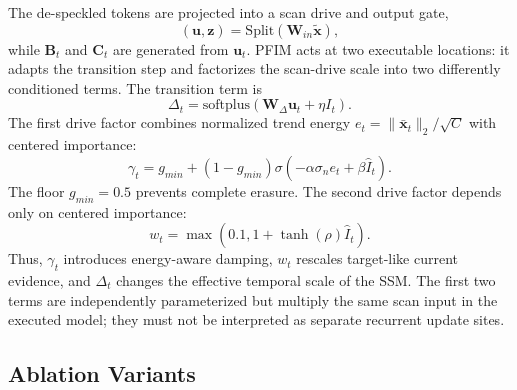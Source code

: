 \documentclass[letterpaper]{article}
\begin{document}
The de-speckled tokens are projected into a scan drive and output gate,
\begin{equation}
  (\mathbf{u},\mathbf{z})=\mathrm{Split}(\mathbf{W}_{in}\widetilde{\mathbf{x}}),
\end{equation}
while $\mathbf{B}_t$ and $\mathbf{C}_t$ are generated from $\mathbf{u}_t$. PFIM acts at two executable locations: it adapts the transition step and factorizes the scan-drive scale into two differently conditioned terms. The transition term is
\begin{equation}
  \Delta_t=\mathrm{softplus}(\mathbf{W}_{\Delta}\mathbf{u}_t+\eta I_t).
  \label{eq:delta}
\end{equation}
The first drive factor combines normalized trend energy $e_t=\lVert\bar{\mathbf{x}}_t\rVert_2/\sqrt{C}$ with centered importance:
\begin{equation}
  \gamma_t=g_{min}+(1-g_{min})
  \sigma(-\alpha\sigma_n e_t+\beta\widehat I_t).
  \label{eq:gamma}
\end{equation}
The floor $g_{min}=0.5$ prevents complete erasure. The second drive factor depends only on centered importance:
\begin{equation}
  w_t=\max\!\left(0.1,1+\tanh(\rho)\widehat I_t\right).
  \label{eq:write}
\end{equation}
Thus, $\gamma_t$ introduces energy-aware damping, $w_t$ rescales target-like current evidence, and $\Delta_t$ changes the effective temporal scale of the SSM. The first two terms are independently parameterized but multiply the same scan input in the executed model; they must not be interpreted as separate recurrent update sites.

\subsection{Ablation Variants}
\end{document}
